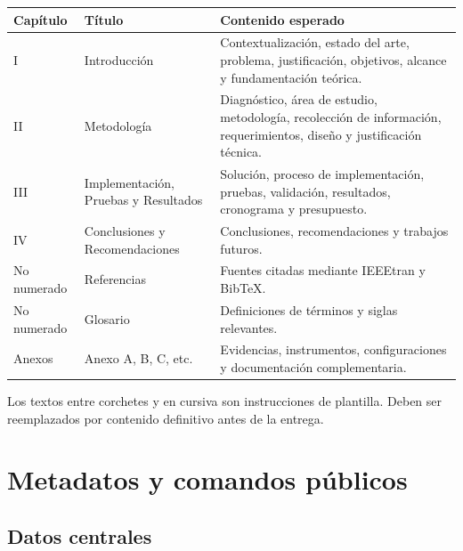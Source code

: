 \documentclass[12pt,a4paper,oneside]{report}
\begin{document}
\begin{longtable}{|p{3cm}|p{4.2cm}|p{5.4cm}|}
  \hline
  \textbf{Capítulo} & \textbf{Título} & \textbf{Contenido esperado} \\
  \hline
  I & Introducción & Contextualización, estado del arte, problema, justificación, objetivos, alcance y fundamentación teórica. \\
  \hline
  II & Metodología & Diagnóstico, área de estudio, metodología, recolección de información, requerimientos, diseño y justificación técnica. \\
  \hline
  III & Implementación, Pruebas y Resultados & Solución, proceso de implementación, pruebas, validación, resultados, cronograma y presupuesto. \\
  \hline
  IV & Conclusiones y Recomendaciones & Conclusiones, recomendaciones y trabajos futuros. \\
  \hline
  No numerado & Referencias & Fuentes citadas mediante IEEEtran y BibTeX. \\
  \hline
  No numerado & Glosario & Definiciones de términos y siglas relevantes. \\
  \hline
  Anexos & Anexo A, B, C, etc. & Evidencias, instrumentos, configuraciones y documentación complementaria. \\
  \hline
\end{longtable}

Los textos entre corchetes y en cursiva son instrucciones de plantilla. Deben ser reemplazados por contenido definitivo antes de la entrega.

\chapter{Metadatos y comandos públicos}

\section{Datos centrales}
\end{document}
